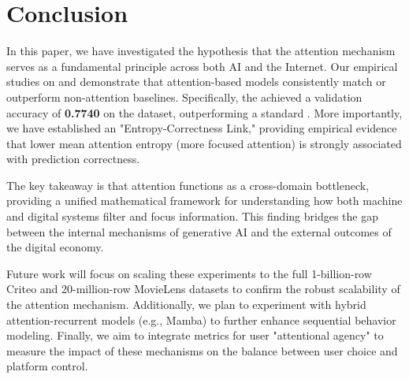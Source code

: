 \section{Conclusion}
\label{sec:conclusion}

In this paper, we have investigated the hypothesis that the attention mechanism serves as a fundamental principle across both AI and the Internet. Our empirical studies on \sectask and \ctrtask demonstrate that attention-based models consistently match or outperform non-attention baselines. Specifically, the \attentionmlp achieved a validation accuracy of {\bf 0.7740} on the \criteo dataset, outperforming a standard \mlp. More importantly, we have established an "Entropy-Correctness Link," providing empirical evidence that lower mean attention entropy (more focused attention) is strongly associated with prediction correctness.

The key takeaway is that attention functions as a cross-domain bottleneck, providing a unified mathematical framework for understanding how both machine and digital systems filter and focus information. This finding bridges the gap between the internal mechanisms of generative AI and the external outcomes of the digital economy.

Future work will focus on scaling these experiments to the full 1-billion-row Criteo and 20-million-row MovieLens datasets to confirm the robust scalability of the attention mechanism. Additionally, we plan to experiment with hybrid attention-recurrent models (e.g., Mamba) to further enhance sequential behavior modeling. Finally, we aim to integrate metrics for user "attentional agency" to measure the impact of these mechanisms on the balance between user choice and platform control.

